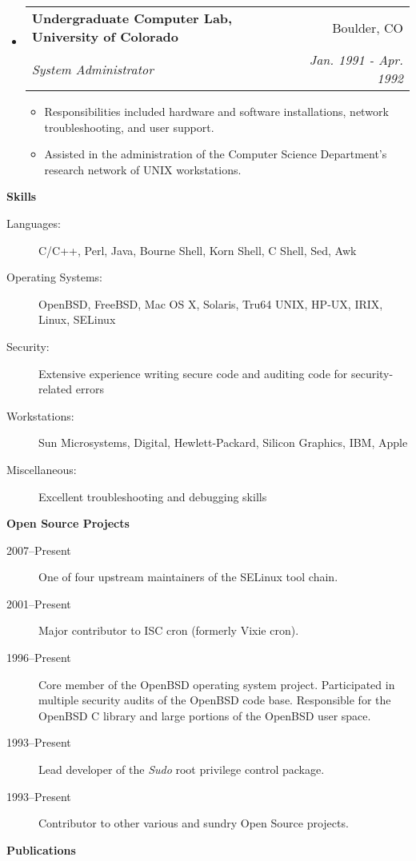 \documentclass[letterpaper,11pt]{article}
\makeatletter
\newcommand{\resitem}[1]{\item #1 \vspace{-2pt}}
\newcommand{\resheading}[1]{{\large \colorbox{mygrey}{\begin{minipage}{\textwidth}{\textbf{#1 \vphantom{p\^{E}}}}\end{minipage}}}}
\newcommand{\ressubheading}[4]{
\begin{tabular*}{6.5in}{l@{\extracolsep{\fill}}r}
		\textbf{#1} & #2 \\
		\textit{#3} & \textit{#4} \\
\end{tabular*}\vspace{-6pt}}
\makeatother
\begin{document}
\begin{itemize}
\item
	\ressubheading{Undergraduate Computer Lab, University of Colorado}{Boulder, CO}{System Administrator}{Jan. 1991 - Apr. 1992}
	\begin{itemize}
		\resitem{Responsibilities included hardware and software installations, network troubleshooting, and user support.}
		\resitem{Assisted in the administration of the Computer Science Department's research network of {\sc UNIX} workstations.}
	\end{itemize}

\end{itemize}

\resheading{Skills}

\begin{description}
\item[Languages:]
C/C++, Perl, Java, Bourne Shell, Korn Shell, C Shell, Sed, Awk
\item[Operating Systems:]
OpenBSD, FreeBSD, Mac OS X, Solaris, Tru64 {\sc UNIX}, {\sc HP-UX}, {\sc IRIX}, Linux, SELinux
\item[Security:]
Extensive experience writing secure code and auditing code for security-related errors
\item[Workstations:]
Sun Microsystems, Digital, Hewlett-Packard, Silicon Graphics, {\sc IBM}, Apple
\item[Miscellaneous:]
Excellent troubleshooting and debugging skills
\end{description}

\resheading{Open Source Projects}

\begin{description}
\item[2007--Present] One of four upstream maintainers of the SELinux tool chain.
\item[2001--Present] Major contributor to ISC cron (formerly Vixie cron).
\item[1996--Present] Core member of the OpenBSD operating system project.  Participated in multiple security audits of the OpenBSD code base.  Responsible for the OpenBSD C library and large portions of the OpenBSD user space.
\item[1993--Present] Lead developer of the \emph{Sudo} root privilege control package.
\item[1993--Present] Contributor to other various and sundry Open Source projects.
\end{description}

\resheading{Publications}
\end{document}
